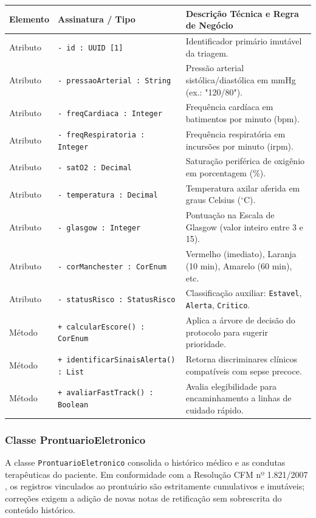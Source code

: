 \begingroup
\small
\noindent\begin{tabularx}{\linewidth}{l >{\raggedright\arraybackslash}p{5.7cm} >{\raggedright\arraybackslash}X}
\toprule
\textbf{Elemento} & \textbf{Assinatura / Tipo} & \textbf{Descrição Técnica e Regra de Negócio} \\
\midrule
Atributo & \texttt{- id : UUID [1]} & Identificador primário imutável da triagem. \\
Atributo & \texttt{- pressaoArterial : String} & Pressão arterial sistólica/diastólica em mmHg (ex.: "120/80"). \\
Atributo & \texttt{- freqCardiaca : Integer} & Frequência cardíaca em batimentos por minuto (bpm). \\
Atributo & \texttt{- freqRespiratoria : Integer} & Frequência respiratória em incursões por minuto (irpm). \\
Atributo & \texttt{- satO2 : Decimal} & Saturação periférica de oxigênio em porcentagem (\%). \\
Atributo & \texttt{- temperatura : Decimal} & Temperatura axilar aferida em graus Celsius ($^\circ$C). \\
Atributo & \texttt{- glasgow : Integer} & Pontuação na Escala de Glasgow (valor inteiro entre 3 e 15). \\
Atributo & \texttt{- corManchester : CorEnum} & Vermelho (imediato), Laranja (10 min), Amarelo (60 min), etc. \\
Atributo & \texttt{- statusRisco : StatusRisco} & Classificação auxiliar: \texttt{Estavel}, \texttt{Alerta}, \texttt{Critico}. \\
\midrule
Método & \texttt{+ calcularEscore() : CorEnum} & Aplica a árvore de decisão do protocolo para sugerir prioridade. \\
Método & \texttt{+ identificarSinaisAlerta() : List} & Retorna discriminares clínicos compatíveis com sepse precoce. \\
Método & \texttt{+ avaliarFastTrack() : Boolean} & Avalia elegibilidade para encaminhamento a linhas de cuidado rápido. \\
\bottomrule
\end{tabularx}
\endgroup

\subsubsection{Classe ProntuarioEletronico}
A classe \texttt{ProntuarioEletronico} consolida o histórico médico e as condutas terapêuticas do paciente. Em conformidade com a Resolução CFM nº 1.821/2007 \cite{cfm_prontuario:2007}, os registros vinculados ao prontuário são estritamente cumulativos e imutáveis; correções exigem a adição de novas notas de retificação sem sobrescrita do conteúdo histórico.

